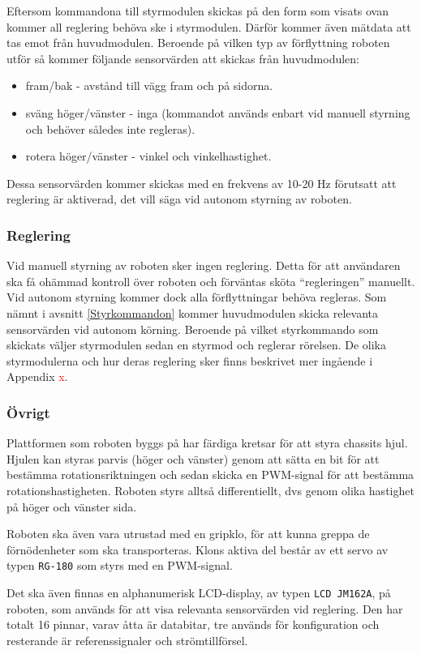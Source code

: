 \documentclass[11pt]{article}
\begin{document}
\begin{flushleft}
Eftersom kommandona till styrmodulen skickas på den form som visats ovan kommer all reglering behöva ske i styrmodulen. Därför kommer även mätdata att tas emot från huvudmodulen. Beroende på vilken typ av förflyttning roboten utför så kommer följande sensorvärden att skickas från huvudmodulen:
\begin{itemize}
	\item fram/bak - avstånd till vägg fram och på sidorna.
	\item sväng höger/vänster - inga (kommandot används enbart vid manuell styrning och behöver således inte regleras).
	\item rotera höger/vänster - vinkel och vinkelhastighet.
\end{itemize}
Dessa sensorvärden kommer skickas med en frekvens av 10-20 Hz förutsatt att reglering är aktiverad, det vill säga vid autonom styrning av roboten.

\subsubsection{Reglering}
Vid manuell styrning av roboten sker ingen reglering. Detta för att användaren ska få ohämmad kontroll över roboten och förväntas sköta ``regleringen'' manuellt. Vid autonom styrning kommer dock alla förflyttningar behöva regleras. Som nämnt i avsnitt \ref{Styrkommandon} kommer huvudmodulen skicka relevanta sensorvärden vid autonom körning. Beroende på vilket styrkommando som skickats väljer styrmodulen sedan en styrmod och reglerar rörelsen. De olika styrmodulerna och hur deras reglering sker finns beskrivet mer ingående i Appendix \textcolor{red}{x}.

\subsubsection{Övrigt}
Plattformen som roboten byggs på har färdiga kretsar för att styra chassits hjul. Hjulen kan styras parvis (höger och vänster) genom att sätta en bit för att bestämma rotationsriktningen och sedan skicka en PWM-signal för att bestämma rotationshastigheten. Roboten styrs alltså differentiellt, dvs genom olika hastighet på höger och vänster sida.

Roboten ska även vara utrustad med en gripklo, för att kunna greppa de förnödenheter som ska transporteras. Klons aktiva del består av ett servo av typen \verb+RG-180+ som styrs med en PWM-signal.

Det ska även finnas en alphanumerisk LCD-display, av typen \verb+LCD JM162A+, på roboten, som används för att visa relevanta sensorvärden vid reglering. Den har totalt 16 pinnar, varav åtta är databitar, tre används för konfiguration och resterande är referenssignaler och strömtillförsel.


\end{flushleft}
\end{document}
